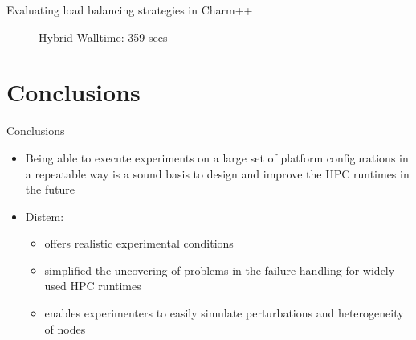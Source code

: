 \documentclass[11pt,xcolor=dvipsnames,presentation]{beamer}
\begin{document}
\begin{frame}[label=sec-2-0-6]{Evaluating load balancing strategies in Charm++}
\begin{minipage}{0.3\textwidth}
\begin{center}
\begin{figure}
    \caption{\centering Hybrid \newline Walltime: 359 secs}
        \label{fig:hybridlbh}
\end{figure}
    \end{center}\end{minipage}
\end{frame}


\section{Conclusions}
\label{sec-3}

\begin{frame}[label=sec-3-0-1]{Conclusions}
\begin{itemize}
\item Being able to execute experiments on a large set of platform
configurations in a repeatable way is a sound basis to design
and improve the HPC runtimes in the future
\end{itemize}

\vspace{0.5cm}
\begin{itemize}
\item \alert{Distem:}
\begin{itemize}
\item offers realistic experimental conditions

\item simplified the uncovering of problems in the
failure handling for widely used HPC runtimes

\item enables experimenters to easily simulate perturbations and
heterogeneity of nodes
\end{itemize}
\end{itemize}
\end{frame}
\end{document}
